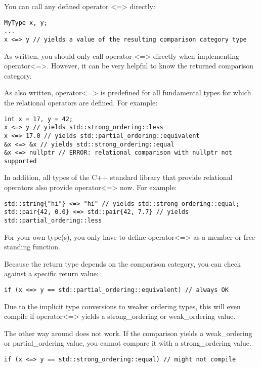 You can call any defined operator <=> directly:

\begin{lstlisting}[style=styleCXX]
MyType x, y;
...
x <=> y // yields a value of the resulting comparison category type
\end{lstlisting}

As written, you should only call operator <=> directly when implementing operator<=>. However, it can be very helpful to know the returned comparison category.

As also written, operator<=> is predefined for all fundamental types for which the relational operators are defined. For example:

\begin{lstlisting}[style=styleCXX]
int x = 17, y = 42;
x <=> y // yields std::strong_ordering::less
x <=> 17.0 // yields std::partial_ordering::equivalent
&x <=> &x // yields std::strong_ordering::equal
&x <=> nullptr // ERROR: relational comparison with nullptr not supported
\end{lstlisting}

In addition, all types of the C++ standard library that provide relational operators also provide operator<=> now. For example:

\begin{lstlisting}[style=styleCXX]
std::string{"hi"} <=> "hi" // yields std::strong_ordering::equal;
std::pair{42, 0.0} <=> std::pair{42, 7.7} // yields std::partial_ordering::less
\end{lstlisting}

For your own type(s), you only have to define operator<=> as a member or free-standing function.

Because the return type depends on the comparison category, you can check against a specific return value:

\begin{lstlisting}[style=styleCXX]
if (x <=> y == std::partial_ordering::equivalent) // always OK
\end{lstlisting}

Due to the implicit type conversions to weaker ordering types, this will even compile if operator<=> yields a strong\_ordering or weak\_ordering value.

The other way around does not work. If the comparison yields a weak\_ordering or partial\_ordering value, you cannot compare it with a strong\_ordering value.

\begin{lstlisting}[style=styleCXX]
if (x <=> y == std::strong_ordering::equal) // might not compile
\end{lstlisting}

